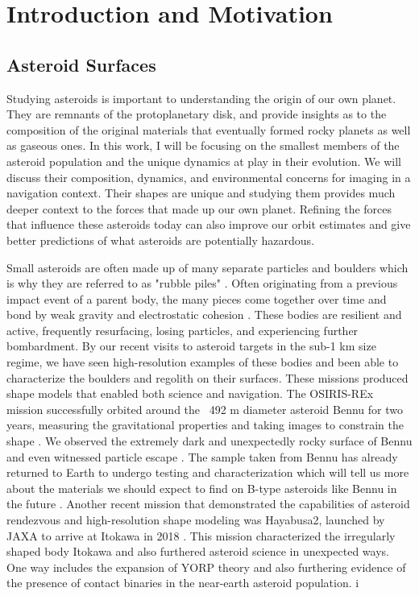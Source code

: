 \chapter{Introduction and Motivation}
\label{introchap}
\section{Asteroid Surfaces} 
Studying asteroids is important to understanding the origin of our own planet. They are remnants of the protoplanetary disk, and provide insights as to the composition of the original materials that eventually formed rocky planets as well as gaseous ones. In this work, I will be focusing on the smallest members of the asteroid population and the unique dynamics at play in their evolution. We will discuss their composition, dynamics, and environmental concerns for imaging in a navigation context. Their shapes are unique and studying them provides much deeper context to the forces that made up our own planet. Refining the forces that influence these asteroids today can also improve our orbit estimates and give better predictions of what asteroids are potentially hazardous. 

Small asteroids are often made up of many separate particles and boulders which is why they are referred to as "rubble piles" \cite{Scheeres2018}. Often originating from a previous impact event of a parent body, the many pieces come together over time and bond by weak gravity and electrostatic cohesion \cite{Walsh2018}. These bodies are resilient and active, frequently resurfacing, losing particles, and experiencing further bombardment. By our recent visits to asteroid targets in the sub-1 km size regime, we have seen high-resolution examples of these bodies and been able to characterize the boulders and regolith on their surfaces. These missions produced shape models that enabled both science and navigation. The OSIRIS-REx mission successfully orbited around the ~492 m diameter asteroid Bennu for two years, measuring the gravitational properties and taking images to constrain the shape \cite{Scheeres2019}. We observed the extremely dark and unexpectedly rocky surface of Bennu and even witnessed particle escape \cite{Hergenrother2019}. The sample taken from Bennu has already returned to Earth to undergo testing and characterization which will tell us more about the materials we should expect to find on B-type asteroids like Bennu in the future \cite{Lauretta2023}. Another recent mission that demonstrated the capabilities of asteroid rendezvous and high-resolution shape modeling was Hayabusa2, launched by JAXA to arrive at Itokawa in 2018 \cite{Watanabe2019}. This mission characterized the irregularly shaped body Itokawa and also furthered asteroid science in unexpected ways. One way includes the expansion of YORP theory and also furthering evidence of the presence of contact binaries in the near-earth asteroid population. i

